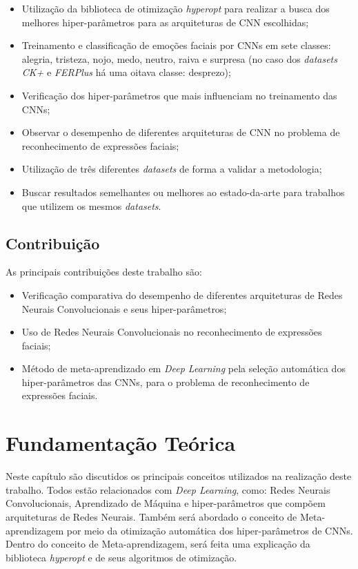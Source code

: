 \documentclass[
12pt,       %
openright,      %
oneside,      %
a4paper,      %
english,      %
french,       %
spanish,      %
brazil        %
]{abntex2}
\begin{document}
\begin{itemize}
    \item Utilização da biblioteca de otimização \textit{hyperopt} para realizar a busca dos melhores hiper-parâmetros para as arquiteturas de CNN escolhidas;
    \item Treinamento e classificação de emoções faciais por CNNs em sete classes: alegria, tristeza, nojo, medo, neutro, raiva e surpresa (no caso dos \textit{datasets} \textit{CK+} e \textit{FERPlus} há uma oitava classe: desprezo);
    \item Verificação dos hiper-parâmetros que mais influenciam no treinamento das CNNs;
    \item Observar o desempenho de diferentes arquiteturas de CNN no problema de reconhecimento de expressões faciais;
    \item Utilização de três diferentes \textit{datasets} de forma a validar a metodologia;
    \item Buscar resultados semelhantes ou melhores ao estado-da-arte para trabalhos que utilizem os mesmos \textit{datasets}.
\end{itemize}

\section{Contribuição} \label{contribuicao}

As principais contribuições deste trabalho são:

\begin{itemize}
    \item Verificação comparativa do desempenho de diferentes arquiteturas de Redes Neurais Convolucionais e seus hiper-parâmetros;
    \item Uso de Redes Neurais Convolucionais no reconhecimento de expressões faciais;
    \item Método de meta-aprendizado em \textit{Deep Learning} pela seleção automática dos hiper-parâmetros das CNNs, para o problema de reconhecimento de expressões faciais.
\end{itemize}

 

\chapter{Fundamentação Teórica} \label{fundamentacao}

Neste capítulo são discutidos os principais conceitos utilizados na realização deste trabalho. Todos estão relacionados com \textit{Deep Learning}, como: Redes Neurais Convolucionais, Aprendizado de Máquina e hiper-parâmetros que compõem arquiteturas de Redes Neurais. Também será abordado o conceito de Meta-aprendizagem por meio da otimização automática dos hiper-parâmetros de CNNs. Dentro do conceito de Meta-aprendizagem, será feita uma explicação da biblioteca \textit{hyperopt} e de seus algoritmos de otimização.
\end{document}
